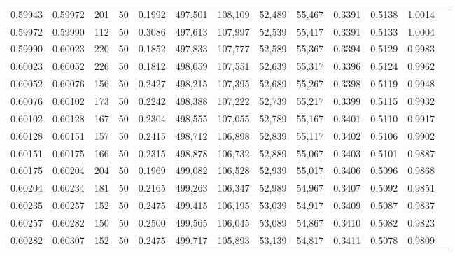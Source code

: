 \begin{tabular}{rrrrrrrrrrrrr}
0.59943 & 0.59972 &   201 &  50 &                                     0.1992 & 497,501 & 108,109 &  52,489 &  55,467 & 0.3391 & 0.5138 & 1.0014 \\
0.59972 & 0.59990 &   112 &  50 &                                     0.3086 & 497,613 & 107,997 &  52,539 &  55,417 & 0.3391 & 0.5133 & 1.0004 \\
0.59990 & 0.60023 &   220 &  50 &                                     0.1852 & 497,833 & 107,777 &  52,589 &  55,367 & 0.3394 & 0.5129 & 0.9983 \\
0.60023 & 0.60052 &   226 &  50 &                                     0.1812 & 498,059 & 107,551 &  52,639 &  55,317 & 0.3396 & 0.5124 & 0.9962 \\
0.60052 & 0.60076 &   156 &  50 &                                     0.2427 & 498,215 & 107,395 &  52,689 &  55,267 & 0.3398 & 0.5119 & 0.9948 \\
0.60076 & 0.60102 &   173 &  50 &                                     0.2242 & 498,388 & 107,222 &  52,739 &  55,217 & 0.3399 & 0.5115 & 0.9932 \\
0.60102 & 0.60128 &   167 &  50 &                                     0.2304 & 498,555 & 107,055 &  52,789 &  55,167 & 0.3401 & 0.5110 & 0.9917 \\
0.60128 & 0.60151 &   157 &  50 &                                     0.2415 & 498,712 & 106,898 &  52,839 &  55,117 & 0.3402 & 0.5106 & 0.9902 \\
0.60151 & 0.60175 &   166 &  50 &                                     0.2315 & 498,878 & 106,732 &  52,889 &  55,067 & 0.3403 & 0.5101 & 0.9887 \\
0.60175 & 0.60204 &   204 &  50 &                                     0.1969 & 499,082 & 106,528 &  52,939 &  55,017 & 0.3406 & 0.5096 & 0.9868 \\
0.60204 & 0.60234 &   181 &  50 &                                     0.2165 & 499,263 & 106,347 &  52,989 &  54,967 & 0.3407 & 0.5092 & 0.9851 \\
0.60235 & 0.60257 &   152 &  50 &                                     0.2475 & 499,415 & 106,195 &  53,039 &  54,917 & 0.3409 & 0.5087 & 0.9837 \\
0.60257 & 0.60282 &   150 &  50 &                                     0.2500 & 499,565 & 106,045 &  53,089 &  54,867 & 0.3410 & 0.5082 & 0.9823 \\
0.60282 & 0.60307 &   152 &  50 &                                     0.2475 & 499,717 & 105,893 &  53,139 &  54,817 & 0.3411 & 0.5078 & 0.9809 \\

\end{tabular}
